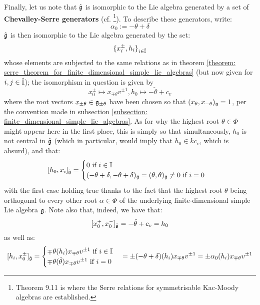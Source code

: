         Finally, let us note that $\hat{\mathfrak{g}}$ is isomorphic to the Lie algebra generated by a set of \textbf{Chevalley-Serre generators} (cf. \cite[Theorems 1.2, 1.4, and 9.11]{kac_infinite_dimensional_lie_algebras}\footnote{Theorem 9.11 is where the Serre relations for symmetrisable Kac-Moody algebras are established.}). To describe these generators, write:
            $$\alpha_0 := -\theta + \delta$$
        $\hat{\mathfrak{g}}$ is then isomorphic to the Lie algebra generated by the set:
            $$\{x_i^{\pm}, h_i\}_{i \in \hat{\mathbb{I}}}$$
        whose elements are subjected to the same relations as in theorem \ref{theorem: serre_theorem_for_finite_dimensional_simple_lie_algebras} (but now given for $i, j \in \hat{\mathbb{I}}$); the isomorphism in question is given by
            $$x_0^{\pm} \mapsto x_{\mp \theta} v^{\pm 1}, h_0 \mapsto -\check{\theta} + c_v$$
        where the root vectors $x_{\pm \theta} \in \mathfrak{g}_{\pm \theta}$ have been chosen so that $(x_{\theta}, x_{-\theta})_{\mathfrak{g}} = 1$, per the convention made in subsection \ref{subsection: finite_dimensional_simple_lie_algebras}. As for why the highest root $\theta \in \Phi$ might appear here in the first place, this is simply so that simultaneously, $h_0$ is not central in $\hat{\mathfrak{g}}$ (which in particular, would imply that $h_0 \in k c_v$, which is absurd), and that:
            $$
                [h_0, x_i]_{\hat{\mathfrak{g}}} =
                \begin{cases}
                    \text{$0$ if $i \in \mathbb{I}$}
                    \\
                    \text{$(-\theta + \delta, -\theta + \delta)_{\hat{\mathfrak{g}}} = (\theta, \theta)_{\hat{\mathfrak{g}}} \not = 0$ if $i = 0$}
                \end{cases}
            $$
        with the first case holding true thanks to the fact that the highest root $\theta$ being orthogonal to every other root $\alpha \in \Phi$ of the underlying finite-dimensional simple Lie algebra $\mathfrak{g}$. Note also that, indeed, we have that:
            $$[x_0^+, x_0^-]_{\hat{\mathfrak{g}}} = -\check{\theta} + c_v = h_0$$
        as well as:
            $$
                [h_i, x_0^{\pm}]_{\hat{\mathfrak{g}}}
                =
                \begin{cases}
                    \text{$\mp \theta(h_i) x_{\mp \theta} v^{\pm 1}$ if $i \in \mathbb{I}$}
                    \\
                    \text{$\mp \theta(\check{\theta}) x_{\mp \theta} v^{\pm 1}$ if $i = 0$}
                \end{cases}
                =
                \pm (-\theta + \delta)(h_i) x_{\mp \theta} v^{\pm 1} = \pm \alpha_0(h_i) x_{\mp \theta} v^{\pm 1}
            $$
